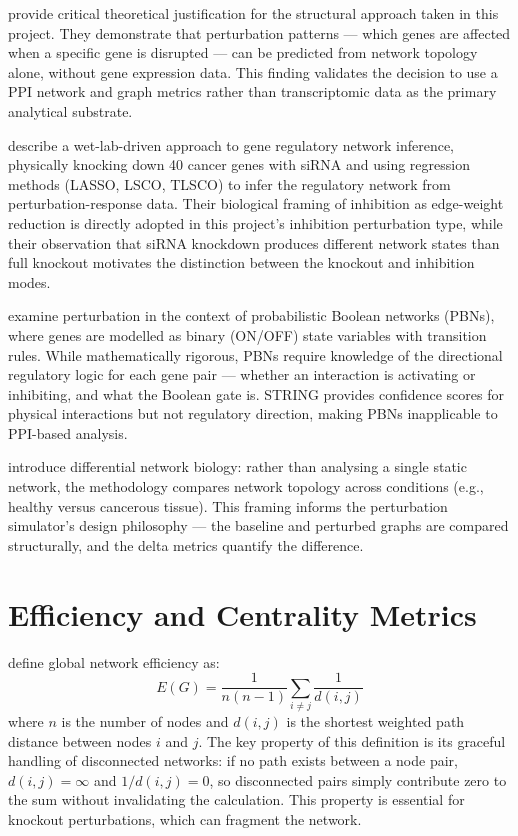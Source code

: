 \documentclass[12pt,a4paper]{report}
\begin{document}
\citet{santolini2018predicting} provide critical theoretical justification for the structural approach taken in this project. They demonstrate that perturbation patterns — which genes are affected when a specific gene is disrupted — can be predicted from network topology alone, without gene expression data. This finding validates the decision to use a PPI network and graph metrics rather than transcriptomic data as the primary analytical substrate.

\citet{morgan2019perturbation} describe a wet-lab-driven approach to gene regulatory network inference, physically knocking down 40 cancer genes with siRNA and using regression methods (LASSO, LSCO, TLSCO) to infer the regulatory network from perturbation-response data. Their biological framing of inhibition as edge-weight reduction is directly adopted in this project's inhibition perturbation type, while their observation that siRNA knockdown produces different network states than full knockout motivates the distinction between the knockout and inhibition modes.

\citet{judeh2021gene} examine perturbation in the context of probabilistic Boolean networks (PBNs), where genes are modelled as binary (ON/OFF) state variables with transition rules. While mathematically rigorous, PBNs require knowledge of the directional regulatory logic for each gene pair — whether an interaction is activating or inhibiting, and what the Boolean gate is. STRING provides confidence scores for physical interactions but not regulatory direction, making PBNs inapplicable to PPI-based analysis.

\citet{ideker2012differential} introduce differential network biology: rather than analysing a single static network, the methodology compares network topology across conditions (e.g., healthy versus cancerous tissue). This framing informs the perturbation simulator's design philosophy — the baseline and perturbed graphs are compared structurally, and the delta metrics quantify the difference.

\section{Efficiency and Centrality Metrics}

\citet{latora2001efficient} define global network efficiency as:
\begin{equation}
  E(G) = \frac{1}{n(n-1)} \sum_{i \neq j} \frac{1}{d(i,j)}
  \label{eq:efficiency}
\end{equation}
where $n$ is the number of nodes and $d(i,j)$ is the shortest weighted path distance between nodes $i$ and $j$. The key property of this definition is its graceful handling of disconnected networks: if no path exists between a node pair, $d(i,j) = \infty$ and $1/d(i,j) = 0$, so disconnected pairs simply contribute zero to the sum without invalidating the calculation. This property is essential for knockout perturbations, which can fragment the network.
\end{document}
